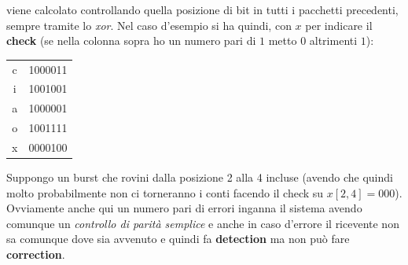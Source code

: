 \documentclass[a4paper,12pt, oneside]{book}
\begin{document}
viene calcolato controllando quella posizione di bit in tutti i pacchetti
precedenti, sempre tramite lo \textit{xor}. Nel caso d'esempio si ha quindi, con
$x$ per indicare il \textbf{check} (se nella colonna sopra ho un numero pari di
$1$ metto $0$ altrimenti $1$):
\begin{table}[H]
  \centering
  \begin{tabular}{c|c}
    c&1000011\\
    i&1001001\\
    a&1000001\\
    o&1001111\\
    \hline
    x&0000100\\
  \end{tabular}
\end{table}
Suppongo un burst che rovini dalla posizione 2 alla 4 incluse (avendo che quindi
molto probabilmente non ci torneranno i conti facendo il check su
$x[2,4]=000$).\\
Ovviamente anche qui un numero pari di errori inganna il sistema avendo comunque
un \textit{controllo di parità semplice} e anche in caso d'errore il ricevente
non sa comunque dove sia avvenuto e quindi fa \textbf{detection} ma non può fare
\textbf{correction}.
\end{document}
